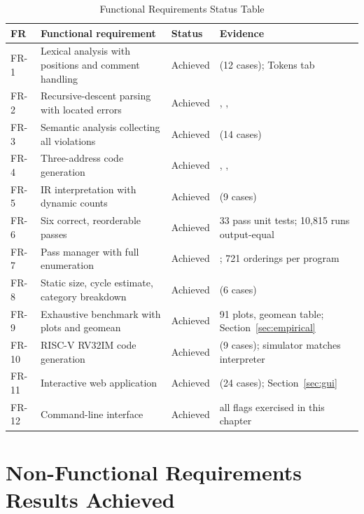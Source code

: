 \begin{table}[H]
\centering\footnotesize\renewcommand{\arraystretch}{0.96}\captionsetup{skip=3pt}
\caption{Functional Requirements Status Table}
\label{tab:fr-status}
\begin{tabular}{L{1.0cm} L{5.4cm} L{1.4cm} L{5.8cm}}
\toprule
\textbf{FR} & \textbf{Functional requirement} & \textbf{Status} & \textbf{Evidence}\\
\midrule
FR-1 & Lexical analysis with positions and comment handling & Achieved &  (12 cases); Tokens tab\\
FR-2 & Recursive-descent parsing with located errors & Achieved & , , \\
FR-3 & Semantic analysis collecting all violations & Achieved &  (14 cases)\\
FR-4 & Three-address code generation & Achieved & , , \\
FR-5 & IR interpretation with dynamic counts & Achieved &  (9 cases)\\
FR-6 & Six correct, reorderable passes & Achieved & 33 pass unit tests; 10{,}815 runs output-equal\\
FR-7 & Pass manager with full enumeration & Achieved & ; 721 orderings per program\\
FR-8 & Static size, cycle estimate, category breakdown & Achieved &  (6 cases)\\
FR-9 & Exhaustive benchmark with plots and geomean & Achieved & 91 plots, geomean table; Section~\ref{sec:empirical}\\
FR-10 & RISC-V RV32IM code generation & Achieved &  (9 cases); simulator matches interpreter\\
FR-11 & Interactive web application & Achieved &  (24 cases); Section~\ref{sec:gui}\\
FR-12 & Command-line interface & Achieved & all flags exercised in this chapter\\
\bottomrule
\end{tabular}
\end{table}
\setlength{\intextsep}{14pt}
\clearpage

\section{Non-Functional Requirements Results Achieved}
\label{sec:nfr}

